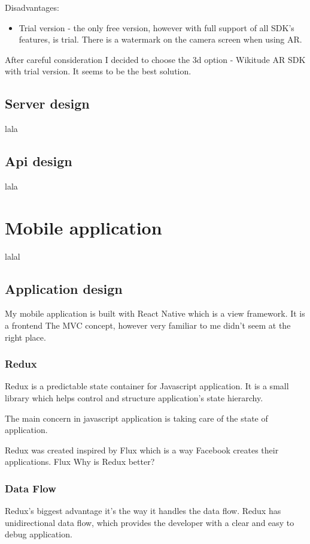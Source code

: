 \documentclass[thesis=M,english]{FITthesis}[2012/10/20]
\begin{document}
\begin{itemize}
	Disadvantages:
	\begin{itemize}
		\item{Trial version} - the only free version, however with full support of all SDK's features, is trial. There is a watermark on the camera screen when using AR.
	\end{itemize}		
\end{itemize}


After careful consideration I decided to choose the 3d option - Wikitude AR SDK with trial version. It seems to be the best solution.

\subsection{Server design}
lala

\subsection{Api design}
lala

\section{Mobile application}
lalal
\subsection{Application design}
My mobile application is built with React Native which is a view framework. It is a frontend The MVC concept, however very familiar to me didn't seem at the right place. 

\subsubsection{Redux}
Redux is a predictable state container for Javascript application. It is a small library which helps control and structure application's state hierarchy.

The main concern in javascript application is taking care of the state of application. 

Redux was created inspired by Flux which is a way Facebook creates their applications.
Flux
Why is Redux better?

\subsubsection{Data Flow}
Redux's biggest advantage it's the way it handles the data flow. Redux has unidirectional data flow, which provides the developer with a clear and easy to debug application.
\end{document}
